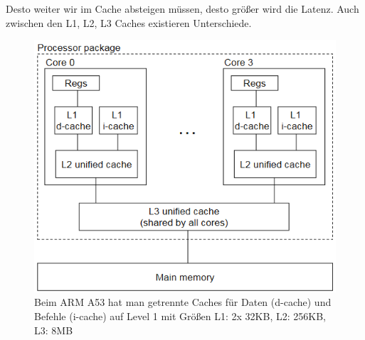 \documentclass[a4paper,12pt,leqno]{article}
\begin{document}
Desto weiter wir im Cache absteigen müssen, desto größer wird die Latenz. Auch zwischen den L1, L2, L3 Caches existieren Unterschiede.

\begin{figure}[h!]
\centering
\includegraphics[scale=0.7]{Grafiken/ARMCachehierarchie.png}
\caption{Beim ARM A53 hat man getrennte Caches für Daten (d-cache) und Befehle (i-cache) auf Level 1 mit Größen L1: 2x 32KB, L2: 256KB, L3: 8MB}
\end{figure}
\end{document}
